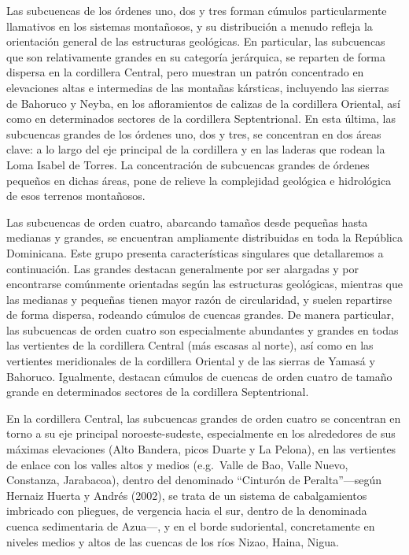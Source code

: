 \documentclass[spanish]{article}
\begin{document}
Las subcuencas de los órdenes uno, dos y tres forman cúmulos
particularmente llamativos en los sistemas montañosos, y su distribución
a menudo refleja la orientación general de las estructuras geológicas.
En particular, las subcuencas que son relativamente grandes en su
categoría jerárquica, se reparten de forma dispersa en la cordillera
Central, pero muestran un patrón concentrado en elevaciones altas e
intermedias de las montañas kársticas, incluyendo las sierras de
Bahoruco y Neyba, en los afloramientos de calizas de la cordillera
Oriental, así como en determinados sectores de la cordillera
Septentrional. En esta última, las subcuencas grandes de los órdenes
uno, dos y tres, se concentran en dos áreas clave: a lo largo del eje
principal de la cordillera y en las laderas que rodean la Loma Isabel de
Torres. La concentración de subcuencas grandes de órdenes pequeños en
dichas áreas, pone de relieve la complejidad geológica e hidrológica de
esos terrenos montañosos.

Las subcuencas de orden cuatro, abarcando tamaños desde pequeñas hasta
medianas y grandes, se encuentran ampliamente distribuidas en toda la
República Dominicana. Este grupo presenta características singulares que
detallaremos a continuación. Las grandes destacan generalmente por ser
alargadas y por encontrarse comúnmente orientadas según las estructuras
geológicas, mientras que las medianas y pequeñas tienen mayor razón de
circularidad, y suelen repartirse de forma dispersa, rodeando cúmulos de
cuencas grandes. De manera particular, las subcuencas de orden cuatro
son especialmente abundantes y grandes en todas las vertientes de la
cordillera Central (más escasas al norte), así como en las vertientes
meridionales de la cordillera Oriental y de las sierras de Yamasá y
Bahoruco. Igualmente, destacan cúmulos de cuencas de orden cuatro de
tamaño grande en determinados sectores de la cordillera Septentrional.

En la cordillera Central, las subcuencas grandes de orden cuatro se
concentran en torno a su eje principal noroeste-sudeste, especialmente
en los alrededores de sus máximas elevaciones (Alto Bandera, picos
Duarte y La Pelona), en las vertientes de enlace con los valles altos y
medios (e.g.~Valle de Bao, Valle Nuevo, Constanza, Jarabacoa), dentro
del denominado ``Cinturón de Peralta''---según Hernaiz Huerta y Andrés
(2002), se trata de un sistema de cabalgamientos imbricado con pliegues,
de vergencia hacia el sur, dentro de la denominada cuenca sedimentaria
de Azua---, y en el borde sudoriental, concretamente en niveles medios y
altos de las cuencas de los ríos Nizao, Haina, Nigua.
\end{document}
